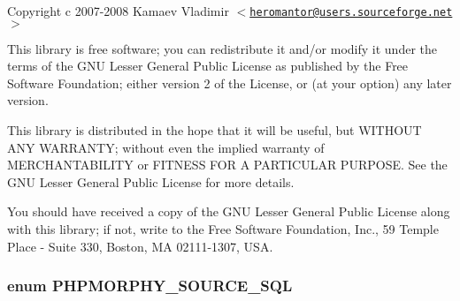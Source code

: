 Copyright c 2007-\/2008 Kamaev Vladimir $<$\href{mailto:heromantor@users.sourceforge.net}{\tt heromantor@users.sourceforge.net}$>$

This library is free software; you can redistribute it and/or modify it under the terms of the GNU Lesser General Public License as published by the Free Software Foundation; either version 2 of the License, or (at your option) any later version.

This library is distributed in the hope that it will be useful, but WITHOUT ANY WARRANTY; without even the implied warranty of MERCHANTABILITY or FITNESS FOR A PARTICULAR PURPOSE. See the GNU Lesser General Public License for more details.

You should have received a copy of the GNU Lesser General Public License along with this library; if not, write to the Free Software Foundation, Inc., 59 Temple Place -\/ Suite 330, Boston, MA 02111-\/1307, USA. \hypertarget{source_8php_a82d38ab6f7e78690e5c14388aa7481b5}{
\subsubsection[{PHPMORPHY\_\-SOURCE\_\-SQL}]{\setlength{\rightskip}{0pt plus 5cm}enum {\bf PHPMORPHY\_\-SOURCE\_\-SQL}}}
\label{source_8php_a82d38ab6f7e78690e5c14388aa7481b5}
